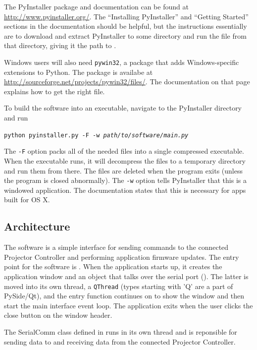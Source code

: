 \documentclass{article}
\begin{document}
The PyInstaller package and documentation can be found at \url{http://www.pyinstaller.org/}.  The
``Installing PyInstaller'' and ``Getting Started'' sections in the documentation should be helpful,
but the instructions essentially are to download and extract PyInstaller to some directory and run
the  file from that directory, giving it the path to .

Windows users will also need \texttt{pywin32}, a package that adds Windows-specific extensions to
Python.  The package is availabe at \url{http://sourceforge.net/projects/pywin32/files/}.  The
documentation on that page explains how to get the right file.

To build the software into an executable, navigate to the PyInstaller directory and run

\begin{center}
    \texttt{python pyinstaller.py -F -w \textit{path/to/software/main.py}}
\end{center}

The \texttt{-F} option packs all of the needed files into a single compressed executable.  When the
executable runs, it will decompress the files to a temporary directory and run them from there.  The
files are deleted when the program exits (unless the program is closed abnormally).  The \texttt{-w}
option tells PyInstaller that this is a windowed application.  The documentation states that this is
necessary for apps built for OS X.

\subsection{Architecture} \label{ssec:SWArchitecture} 
The software is a simple interface for sending commands to the connected Projector Controller and
performing application firmware updates.  The entry point for the software is
.  When the application starts up, it creates the application window and an
object that talks over the serial port ().  The latter is moved into
its own thread, a \texttt{QThread} (types starting with 'Q' are a part of PySide/Qt), and the entry
function continues on to show the window and then start the main interface event loop.  The
application exits when the user clicks the close button on the window header.

The SerialComm class defined in  runs in its own thread and is
reponsible for sending data to and receiving data from the connected Projector Controller.
\end{document}
